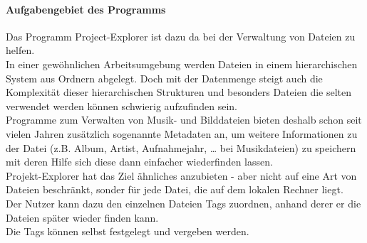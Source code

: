 \documentclass[10pt,paper=a4,final]{scrartcl}
\begin{document}
\paragraph{Aufgabengebiet des Programms}
Das Programm Project-Explorer ist dazu da bei der Verwaltung von Dateien zu helfen.\\
In einer gew\"ohnlichen Arbeitsumgebung werden Dateien in einem hierarchischen System aus Ordnern abgelegt. Doch mit der Datenmenge steigt auch die Komplexit\"at dieser hierarchischen Strukturen und besonders Dateien die selten verwendet werden k\"onnen schwierig aufzufinden sein.\\
Programme zum Verwalten von Musik- und Bilddateien bieten deshalb schon seit vielen Jahren zus\"atzlich sogenannte Metadaten an, um weitere Informationen zu der Datei (z.B. Album, Artist, Aufnahmejahr, … bei Musikdateien) zu speichern mit deren Hilfe sich diese dann einfacher wiederfinden lassen.\\
Projekt-Explorer hat das Ziel \"ahnliches anzubieten - aber nicht auf eine Art von Dateien beschr\"ankt, sonder f\"ur jede Datei, die auf dem lokalen Rechner liegt.\\
Der Nutzer kann dazu den einzelnen Dateien Tags zuordnen, anhand derer er die Dateien sp\"ater wieder finden kann.\\
Die Tags k\"onnen selbst festgelegt und vergeben werden.
\end{document}
